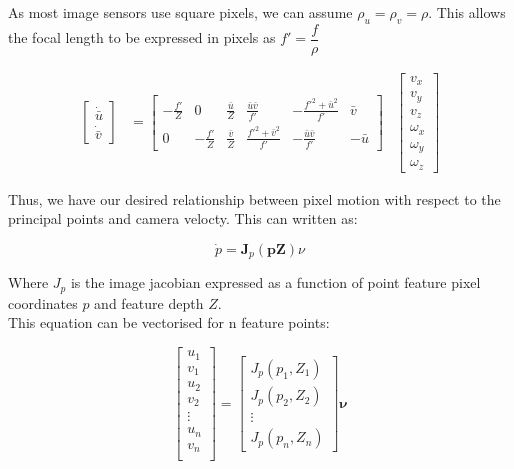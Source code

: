 \documentclass{UoNMCHA}
\numberwithin{equation}{section}
\begin{document}
As most image sensors use square pixels, we can assume $\rho_{u} = \rho_{v} = \rho $. This allows the focal length to be expressed in pixels as $f' = \dfrac{f}{\rho}$

\begin{equation}\label{eqn:ImageJacobian}
\begin{aligned}
\begin{bmatrix}
\dot{\bar{u}} \\
\dot{\bar{v}}
\end{bmatrix}
& =
\begin{bmatrix}
-\frac{f'}{Z} & 0 & \frac{\bar{u}}{Z} & \frac{\bar{u} \bar{v}}{f'} & -\frac{f'^{2}+ \bar{u}^{2}}{f'} & \bar{v} \\

0 & -\frac{f'}{Z} & \frac{\bar{v}}{Z} & \frac{f'^{2} + \bar{v}^{2}}{f'} & -\frac{\bar{u} \bar{v}}{f'} & -\bar{u}
\end{bmatrix}
&
\begin{bmatrix}
v_{x} \\
v_{y} \\
v_{z} \\
\omega_{x} \\
\omega_{y} \\
\omega_{z}
\end{bmatrix}
\end{aligned}
\end{equation}

Thus, we have our desired relationship between pixel motion with respect to the principal points and camera velocty. This can written as:

\begin{equation}
	\dot{p} = \mathbf{J}_{p} (\mathbf{p}\mathbf{Z})\nu
\end{equation}

Where $J_{p}$ is the image jacobian expressed as a function of point feature pixel coordinates $p$ and feature depth $Z$. \\
This equation can be vectorised for n feature points:

\begin{equation}\label{imagejacobianequationstacked}
	\begin{bmatrix} 
		u_{1}  \\
		v_{1}  \\
		u_{2}  \\
		v_{2}  \\
		\vdots \\
		u_{n}  \\
		v_{n}  \\  
	\end{bmatrix} = 
	{\begin{bmatrix} 
		J_{p}(p_{1} , Z_{1})   \\
		J_{p}(p_{2} , Z_{2})   \\
		\vdots \\
		J_{p}(p_{n} , Z_{n})
		\end{bmatrix}}\mathbf{\nu} 	
\end{equation} 
\end{document}
